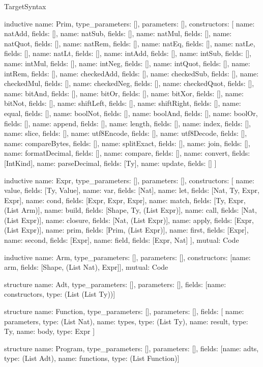 \begin{lexlean}{TargetSyntax}
\begin{semanticmodule}
inductive{
  name: Prim,
  type_parameters: [],
  parameters: [],
  constructors: [
    {name: natAdd, fields: []},
    {name: natSub, fields: []},
    {name: natMul, fields: []},
    {name: natQuot, fields: []},
    {name: natRem, fields: []},
    {name: natEq, fields: []},
    {name: natLe, fields: []},
    {name: natLt, fields: []},
    {name: intAdd, fields: []},
    {name: intSub, fields: []},
    {name: intMul, fields: []},
    {name: intNeg, fields: []},
    {name: intQuot, fields: []},
    {name: intRem, fields: []},
    {name: checkedAdd, fields: []},
    {name: checkedSub, fields: []},
    {name: checkedMul, fields: []},
    {name: checkedNeg, fields: []},
    {name: checkedQuot, fields: []},
    {name: bitAnd, fields: []},
    {name: bitOr, fields: []},
    {name: bitXor, fields: []},
    {name: bitNot, fields: []},
    {name: shiftLeft, fields: []},
    {name: shiftRight, fields: []},
    {name: equal, fields: []},
    {name: boolNot, fields: []},
    {name: boolAnd, fields: []},
    {name: boolOr, fields: []},
    {name: append, fields: []},
    {name: length, fields: []},
    {name: index, fields: []},
    {name: slice, fields: []},
    {name: utf8Encode, fields: []},
    {name: utf8Decode, fields: []},
    {name: compareBytes, fields: []},
    {name: splitExact, fields: []},
    {name: join, fields: []},
    {name: formatDecimal, fields: []},
    {name: compare, fields: []},
    {name: convert, fields: [IntKind]},
    {name: parseDecimal, fields: [Ty]},
    {name: update, fields: []}
  ]
}

inductive{
  name: Expr,
  type_parameters: [],
  parameters: [],
  constructors: [
    {name: value, fields: [Ty, Value]},
    {name: var, fields: [Nat]},
    {name: let, fields: [Nat, Ty, Expr, Expr]},
    {name: cond, fields: [Expr, Expr, Expr]},
    {name: match, fields: [Ty, Expr, (List Arm)]},
    {name: build, fields: [Shape, Ty, (List Expr)]},
    {name: call, fields: [Nat, (List Expr)]},
    {name: closure, fields: [Nat, (List Expr)]},
    {name: apply, fields: [Expr, (List Expr)]},
    {name: prim, fields: [Prim, (List Expr)]},
    {name: first, fields: [Expr]},
    {name: second, fields: [Expr]},
    {name: field, fields: [Expr, Nat]}
  ],
  mutual: Code
}

inductive{
  name: Arm,
  type_parameters: [],
  parameters: [],
  constructors: [{name: arm, fields: [Shape, (List Nat), Expr]}],
  mutual: Code
}

structure{
  name: Adt,
  type_parameters: [],
  parameters: [],
  fields: [{name: constructors, type: (List (List Ty))}]
}

structure{
  name: Function,
  type_parameters: [],
  parameters: [],
  fields: [
    {name: parameters, type: (List Nat)},
    {name: types, type: (List Ty)},
    {name: result, type: Ty},
    {name: body, type: Expr}
  ]
}

structure{
  name: Program,
  type_parameters: [],
  parameters: [],
  fields: [{name: adts, type: (List Adt)}, {name: functions, type: (List Function)}]
}
\end{semanticmodule}
\end{lexlean}
